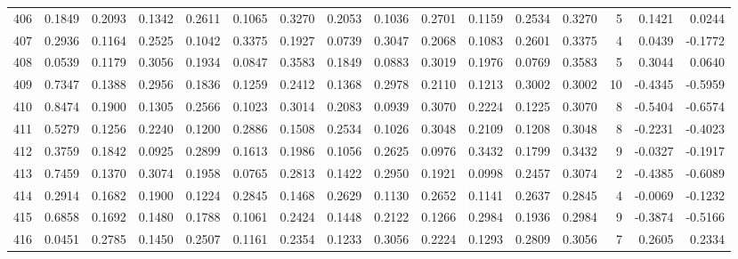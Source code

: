 \begin{tabular}{lrrrrrrrrrrrrrrr}
406 &      0.1849 &  0.2093 &  0.1342 &  0.2611 &  0.1065 &  0.3270 &  0.2053 &  0.1036 &  0.2701 &  0.1159 &   0.2534 &     0.3270 &      5 &                    0.1421 &                     0.0244 \\
407 &      0.2936 &  0.1164 &  0.2525 &  0.1042 &  0.3375 &  0.1927 &  0.0739 &  0.3047 &  0.2068 &  0.1083 &   0.2601 &     0.3375 &      4 &                    0.0439 &                    -0.1772 \\
408 &      0.0539 &  0.1179 &  0.3056 &  0.1934 &  0.0847 &  0.3583 &  0.1849 &  0.0883 &  0.3019 &  0.1976 &   0.0769 &     0.3583 &      5 &                    0.3044 &                     0.0640 \\
409 &      0.7347 &  0.1388 &  0.2956 &  0.1836 &  0.1259 &  0.2412 &  0.1368 &  0.2978 &  0.2110 &  0.1213 &   0.3002 &     0.3002 &     10 &                   -0.4345 &                    -0.5959 \\
410 &      0.8474 &  0.1900 &  0.1305 &  0.2566 &  0.1023 &  0.3014 &  0.2083 &  0.0939 &  0.3070 &  0.2224 &   0.1225 &     0.3070 &      8 &                   -0.5404 &                    -0.6574 \\
411 &      0.5279 &  0.1256 &  0.2240 &  0.1200 &  0.2886 &  0.1508 &  0.2534 &  0.1026 &  0.3048 &  0.2109 &   0.1208 &     0.3048 &      8 &                   -0.2231 &                    -0.4023 \\
412 &      0.3759 &  0.1842 &  0.0925 &  0.2899 &  0.1613 &  0.1986 &  0.1056 &  0.2625 &  0.0976 &  0.3432 &   0.1799 &     0.3432 &      9 &                   -0.0327 &                    -0.1917 \\
413 &      0.7459 &  0.1370 &  0.3074 &  0.1958 &  0.0765 &  0.2813 &  0.1422 &  0.2950 &  0.1921 &  0.0998 &   0.2457 &     0.3074 &      2 &                   -0.4385 &                    -0.6089 \\
414 &      0.2914 &  0.1682 &  0.1900 &  0.1224 &  0.2845 &  0.1468 &  0.2629 &  0.1130 &  0.2652 &  0.1141 &   0.2637 &     0.2845 &      4 &                   -0.0069 &                    -0.1232 \\
415 &      0.6858 &  0.1692 &  0.1480 &  0.1788 &  0.1061 &  0.2424 &  0.1448 &  0.2122 &  0.1266 &  0.2984 &   0.1936 &     0.2984 &      9 &                   -0.3874 &                    -0.5166 \\
416 &      0.0451 &  0.2785 &  0.1450 &  0.2507 &  0.1161 &  0.2354 &  0.1233 &  0.3056 &  0.2224 &  0.1293 &   0.2809 &     0.3056 &      7 &                    0.2605 &                     0.2334 \\

\end{tabular}
